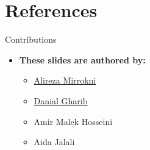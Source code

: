 \documentclass[serif, aspectratio=169]{beamer}
\begin{document}


\section{References}

\begin{frame}{Contributions}
\begin{itemize}
\item \textbf{These slides are authored by:}
\begin{itemize}
    \setlength{\itemsep}{5pt} %
    \item \href{https://github.com/alirezamirrokni}{Alireza Mirrokni}
    \item \href{https://github.com/Danial-Gharib}{Danial Gharib}
    \item {Amir Malek Hosseini}
    \item {Aida Jalali}
\end{itemize}
\end{itemize}

\end{frame}

\begin{frame}[allowframebreaks]
    
    
    \nocite{*}
\end{frame}
\end{document}
